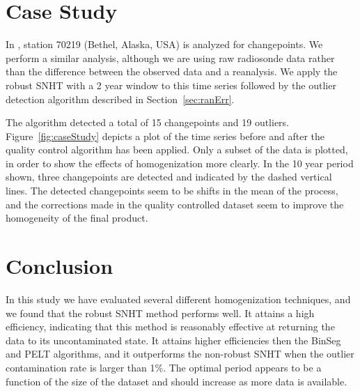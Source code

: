 \documentclass[12pt]{article}
\begin{document}
\begin{doublespacing}

\section{Case Study}

In \cite{haimberger07}, station 70219 (Bethel, Alaska, USA) is analyzed for changepoints.  We perform a similar analysis, although we are using raw radiosonde data rather than the difference between the observed data and a reanalysis.  We apply the robust SNHT with a 2 year window to this time series followed by the outlier detection algorithm described in Section~\ref{sec:ranErr}.

The algorithm detected a total of 15 changepoints and 19 outliers.  Figure~\ref{fig:caseStudy} depicts a plot of the time series before and after the quality control algorithm has been applied.  Only a subset of the data is plotted, in order to show the effects of homogenization more clearly.  In the 10 year period shown, three changepoints are detected and indicated by the dashed vertical lines.  The detected changepoints seem to be shifts in the mean of the process, and the corrections made in the quality controlled dataset seem to improve the homogeneity of the final product.

\section{Conclusion}

In this study we have evaluated several different homogenization techniques, and we found that the robust SNHT method performs well.  It attains a high efficiency, indicating that this method is reasonably effective at returning the data to its uncontaminated state.  It attains higher efficiencies then the BinSeg and PELT algorithms, and it outperforms the non-robust SNHT when the outlier contamination rate is larger than 1\%.  The optimal period appears to be a function of the size of the dataset and should increase as more data is available.


\end{doublespacing}
\end{document}
